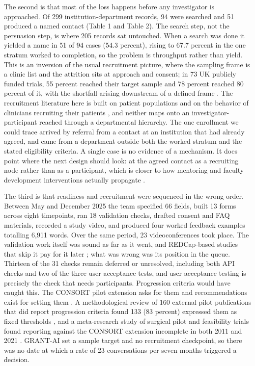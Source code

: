 \documentclass[11pt,a4paper]{article}
\begin{document}
The second is that most of the loss happens before any investigator is approached. Of 299 institution-department records, 94 were searched and 51 produced a named contact (Table 1 and Table 2). The search step, not the persuasion step, is where 205 records sat untouched. When a search was done it yielded a name in 51 of 94 cases (54.3 percent), rising to 67.7 percent in the one stratum worked to completion, so the problem is throughput rather than yield. This is an inversion of the usual recruitment picture, where the sampling frame is a clinic list and the attrition sits at approach and consent; in 73 UK publicly funded trials, 55 percent reached their target sample and 78 percent reached 80 percent of it, with the shortfall arising downstream of a defined frame \cite{r32,r33}. The recruitment literature here is built on patient populations \cite{r24,r34,r35} and on the behavior of clinicians recruiting their patients \cite{r36}, and neither maps onto an investigator-participant reached through a departmental hierarchy. The one enrollment we could trace arrived by referral from a contact at an institution that had already agreed, and came from a department outside both the worked stratum and the stated eligibility criteria. A single case is no evidence of a mechanism. It does point where the next design should look: at the agreed contact as a recruiting node rather than as a participant, which is closer to how mentoring and faculty development interventions actually propagate \cite{r37}.

The third is that readiness and recruitment were sequenced in the wrong order. Between May and December 2025 the team specified 66 fields, built 13 forms across eight timepoints, ran 18 validation checks, drafted consent and FAQ materials, recorded a study video, and produced four worked feedback examples totalling 6,911 words. Over the same period, 23 videoconferences took place. The validation work itself was sound as far as it went, and REDCap-based studies that skip it pay for it later \cite{r38,r39,r40,r41}; what was wrong was its position in the queue. Thirteen of the 31 checks remain deferred or unresolved, including both API checks and two of the three user acceptance tests, and user acceptance testing is precisely the check that needs participants. Progression criteria would have caught this. The CONSORT pilot extension asks for them \cite{r20} and recommendations exist for setting them \cite{r22}. A methodological review of 160 external pilot publications that did report progression criteria found 133 (83 percent) expressed them as fixed thresholds \cite{r42}, and a meta-research study of surgical pilot and feasibility trials found reporting against the CONSORT extension incomplete in both 2011 and 2021 \cite{r43}. GRANT-AI set a sample target and no recruitment checkpoint, so there was no date at which a rate of 23 conversations per seven months triggered a decision.
\end{document}

